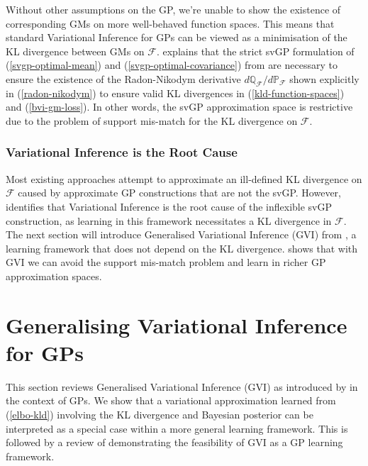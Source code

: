 \documentclass{article}
\numberwithin{equation}{section}
\begin{document}
Without other assumptions on the GP, we're unable to show the existence of corresponding GMs on more well-behaved function spaces. This means that standard Variational Inference for GPs can be viewed as a minimisation of the KL divergence between GMs on $\mathcal{F}$. \cite{matthews2017scalable} explains that the strict svGP formulation of (\ref{svgp-optimal-mean}) and (\ref{svgp-optimal-covariance}) from \cite{titsias2009variational} are necessary to ensure the existence of the Radon-Nikodym derivative $d \mathbb{Q}_\mathcal{F}/d \mathbb{P}_\mathcal{F}$ shown explicitly in (\ref{radon-nikodym}) to ensure valid KL divergences in (\ref{kld-function-spaces}) and (\ref{bvi-gm-loss}). In other words, the svGP approximation space is restrictive due to the problem of support mis-match for the KL divergence on $\mathcal{F}$.

\subsubsection{Variational Inference is the Root Cause}
Most existing approaches attempt to approximate an ill-defined KL divergence on $\mathcal{F}$ caused by approximate GP constructions that are not the svGP. However, \cite{wild2022generalized} identifies that Variational Inference is the root cause of the inflexible svGP construction, as learning in this framework necessitates a KL divergence in $\mathcal{F}$. The next section will introduce Generalised Variational Inference (GVI) from \cite{knoblauch2022optimization}, a learning framework that does not depend on the KL divergence. \cite{wild2022generalized} shows that with GVI we can avoid the support mis-match problem and learn in richer GP approximation spaces.

\newpage
\section{Generalising Variational Inference for GPs}
This section reviews Generalised Variational Inference (GVI) as introduced by \cite{knoblauch2022optimization} in the context of GPs. We show that a variational approximation learned from (\ref{elbo-kld}) involving the KL divergence and Bayesian posterior can be interpreted as a special case within a more general learning framework. This is followed by a review of \cite{wild2022generalized} demonstrating the feasibility of GVI as a GP learning framework.
\end{document}
